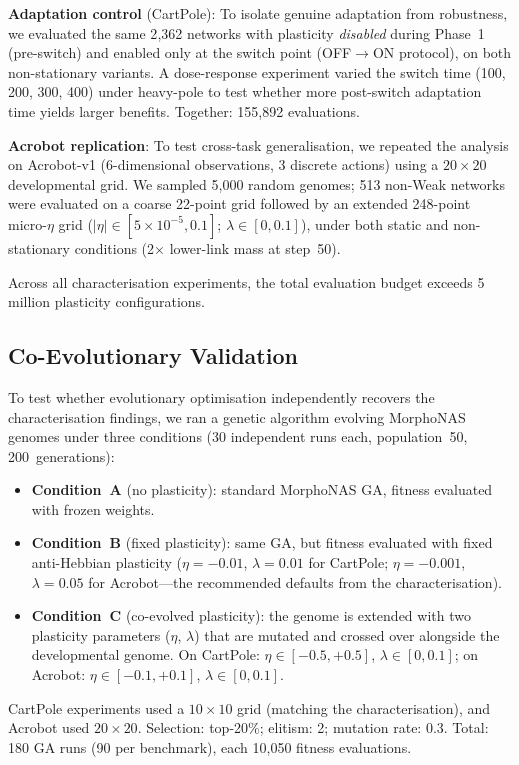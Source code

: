 \documentclass[sigconf,nonacm]{acmart}
\begin{document}
\textbf{Adaptation control} (CartPole): To isolate genuine adaptation from robustness, we evaluated the same 2{,}362 networks with plasticity \emph{disabled} during Phase~1 (pre-switch) and enabled only at the switch point (OFF$\to$ON protocol), on both non-stationary variants. A dose-response experiment varied the switch time (100, 200, 300, 400) under heavy-pole to test whether more post-switch adaptation time yields larger benefits. Together: 155{,}892 evaluations.

\textbf{Acrobot replication}: To test cross-task generalisation, we repeated the analysis on Acrobot-v1 (6-dimensional observations, 3 discrete actions) using a $20 \times 20$ developmental grid. We sampled 5{,}000 random genomes; 513 non-Weak networks were evaluated on a coarse 22-point grid followed by an extended 248-point micro-$\eta$ grid ($|\eta| \in [5 \times 10^{-5}, 0.1]$; $\lambda \in [0, 0.1]$), under both static and non-stationary conditions (2$\times$ lower-link mass at step~50).

Across all characterisation experiments, the total evaluation budget exceeds 5 million plasticity configurations.

\subsection{Co-Evolutionary Validation}
\label{sec:coevolution_design}

To test whether evolutionary optimisation independently recovers the characterisation findings, we ran a genetic algorithm evolving MorphoNAS genomes under three conditions (30 independent runs each, population~50, 200~generations):
\begin{itemize}
  \item \textbf{Condition~A} (no plasticity): standard MorphoNAS GA, fitness evaluated with frozen weights.
  \item \textbf{Condition~B} (fixed plasticity): same GA, but fitness evaluated with fixed anti-Hebbian plasticity ($\eta = -0.01$, $\lambda = 0.01$ for CartPole; $\eta = -0.001$, $\lambda = 0.05$ for Acrobot---the recommended defaults from the characterisation).
  \item \textbf{Condition~C} (co-evolved plasticity): the genome is extended with two plasticity parameters ($\eta$, $\lambda$) that are mutated and crossed over alongside the developmental genome. On CartPole: $\eta \in [-0.5, +0.5]$, $\lambda \in [0, 0.1]$; on Acrobot: $\eta \in [-0.1, +0.1]$, $\lambda \in [0, 0.1]$.
\end{itemize}
CartPole experiments used a $10 \times 10$ grid (matching the characterisation), and Acrobot used $20 \times 20$. Selection: top-20\%; elitism: 2; mutation rate: 0.3.
Total: 180 GA runs (90 per benchmark), each 10{,}050 fitness evaluations.
\end{document}
